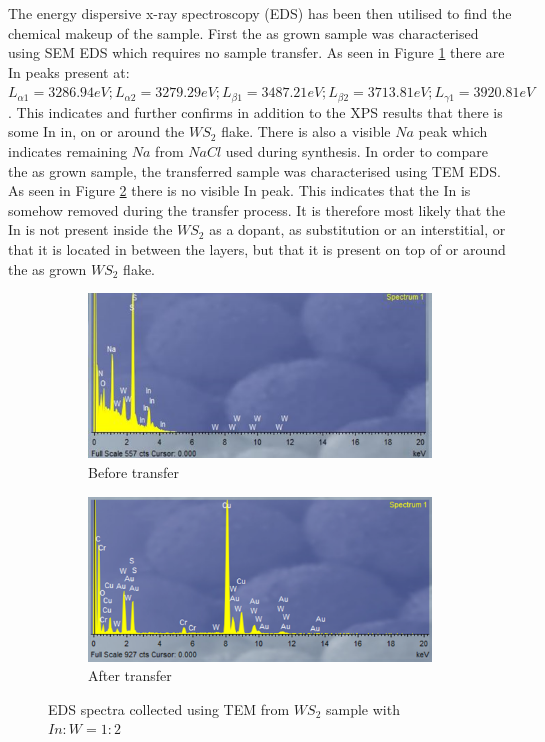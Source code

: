 The energy dispersive x-ray spectroscopy (EDS) has been then utilised to find the chemical makeup of the sample. First the as grown sample was characterised using SEM EDS which requires no sample transfer. As seen in Figure \ref{fig:InTEMEDSFra} there are In peaks present at: $L_{{\alpha}1} = 3286.94 eV; L_{{\alpha}2} = 3279.29 eV; L_{{\beta}1} = 3487.21 eV; L_{{\beta}2} = 3713.81 eV; L_{{\gamma}1} = 3920.81 eV$. This indicates and further confirms in addition to the XPS results that there is some In in, on or around the $WS_2$ flake. There is also a visible $Na$ peak which indicates remaining $Na$ from $NaCl$ used during synthesis. In order to compare the as grown sample, the transferred sample was characterised using TEM EDS. As seen in Figure \ref{fig:InTEMEDS} there is no visible In peak. This indicates that the In is somehow removed during the transfer process. It is therefore most likely that the In is not present inside the $WS_2$ as a dopant, as substitution or an interstitial, or that it is located in between the layers, but that it is present on top of or around the as grown $WS_2$ flake.

\begin{figure}[H]
	\begin{center}
			\begin{subfigure}[b]{0.6\textwidth}
			\includegraphics[width=\textwidth]{In/TEMEDSFra.png}
			\caption{Before transfer}
			\label{fig:InTEMEDSFra}
		\end{subfigure}
		\qquad
		\begin{subfigure}[b]{0.6\textwidth}
			\includegraphics[width=\textwidth]{In/TEMEDS.png}
			\caption{After transfer}
			\label{fig:InTEMEDS}
		\end{subfigure}
		\caption{EDS spectra collected using TEM from $WS_2$ sample with $In:W = 1:2$}
		\label{fig:InTEMEDSSpectra}
	\end{center}
\end{figure}

